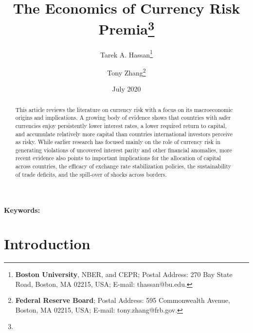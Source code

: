 \documentclass[12pt,letter]{article}
\theoremstyle{break} \theorembodyfont{\normalfont\itshape}
\theoremstyle{break}
\theoremstyle{break} \theorembodyfont{\normalfont\itshape}
\theoremstyle{break} \theorembodyfont{\normalfont\itshape}
\begin{document}
\author{ Tarek A. Hassan\thanks{\textbf{Boston University}, NBER, and
    CEPR; Postal Address: 270 Bay State Road, Boston, MA 02215, USA;
    E-mail: thassan@bu.edu.} \and Tony Zhang\thanks{\textbf{%
      Federal Reserve Board}; Postal Address: 595 Commonwealth Avenue,
    Boston, MA 02215, USA; E-mail: tony.zhang@frb.gov.} }

\title{The Economics of Currency Risk Premia\thanks{}}

\date{\bigskip July 2020}

\maketitle


\thispagestyle{empty}


\vspace{-0.7cm}





\begin{abstract}
  This article reviews the literature on currency risk with a focus on
  its macroeconomic origins and implications. A growing body of
  evidence shows that countries with safer currencies enjoy
  persistently lower interest rates, a lower required return to
  capital, and accumulate relatively more capital than countries
  international investors perceive as risky. While earlier research
  has focused mainly on the role of currency risk in generating
  violations of uncovered interest parity and other financial
  anomalies, more recent evidence also points to important
  implications for the allocation of capital across countries, the
  efficacy of exchange rate stabilization policies, the sustainability
  of trade deficits, and the spill-over of shocks across borders.
\end{abstract}


\bigskip


{\noindent \textbf{Keywords:} }

\pagebreak

 \setcounter{page}{1}


\section{Introduction}
\end{document}
